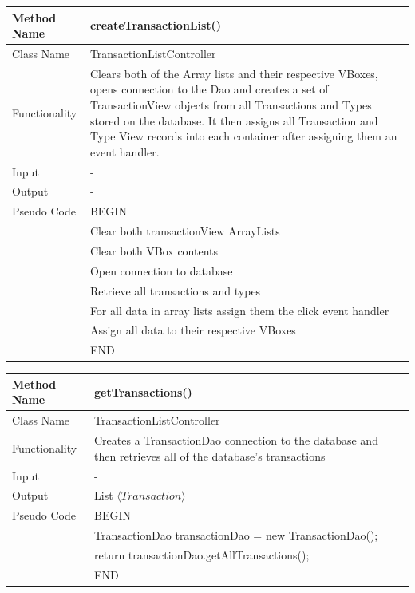\documentclass[12pt]{article}
\begin{document}
\begin{tabular}{ |p{3cm}||p{\colWidth}|  }
	\hline
	Method Name & createTransactionList()\\
	\hline
	Class Name & TransactionListController\\
	\hline
	Functionality & Clears both of the Array lists and their respective VBoxes, opens connection to the Dao and creates a set of TransactionView objects from all Transactions and Types stored on the database. It then assigns all Transaction and Type View records into each container after assigning them an event handler. \\
	\hline
	Input & -\\
	\hline
	Output & -\\
	\hline
	Pseudo Code & BEGIN\\
	& Clear both transactionView ArrayLists\\
	& Clear both VBox contents\\
	& Open connection to database \\
	& Retrieve all transactions and types \\
	& For all data in array lists assign them the click event handler \\
	& Assign all data to their respective VBoxes \\
	& END\\
	\hline
\end{tabular} 

\begin{tabular}{ |p{3cm}||p{\colWidth}|  }
	\hline
	Method Name & getTransactions()\\
	\hline
	Class Name & TransactionListController\\
	\hline
	Functionality & Creates a TransactionDao connection to the database and then retrieves all of the database's transactions \\
	\hline
	Input & -\\
	\hline
	Output & List $\langle Transaction \rangle$\\
	\hline
	Pseudo Code & BEGIN\\
	& 		TransactionDao transactionDao = new TransactionDao();\\
	& 		return transactionDao.getAllTransactions(); \\
	& END\\
	\hline
\end{tabular} 
\end{document}
